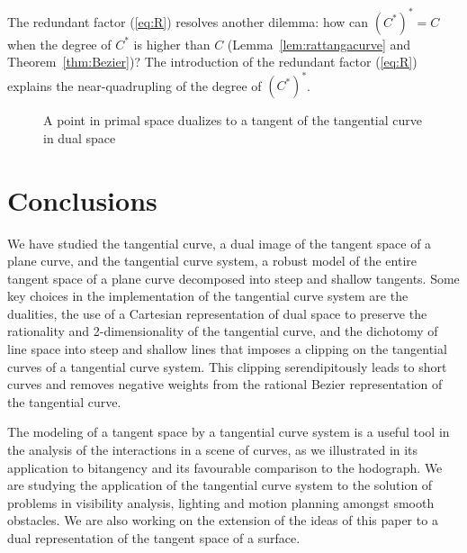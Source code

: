 \documentclass[12pt]{article}
\begin{document}

The redundant factor (\ref{eq:R}) resolves another dilemma:
how can $(C^*)^* = C$ when the degree of $C^*$ is higher than $C$
(Lemma~\ref{lem:rattangacurve} and Theorem~\ref{thm:Bezier})?
The introduction of the redundant factor (\ref{eq:R}) explains the 
near-quadrupling of the degree of $(C^*)^*$.

\begin{figure}[h]
\centerline{}
\caption{A point in primal space dualizes to a tangent of the tangential curve in dual space}
\label{fig:pt2tang}
\end{figure}


\section{Conclusions}
\label{sec:conclude}

We have studied the tangential curve, a dual image of the tangent space of
a plane curve, and the tangential curve system, a robust model of the entire tangent
space of a plane curve decomposed into steep and shallow tangents.
Some key choices in the implementation of the tangential curve system
are the dualities,
the use of a Cartesian representation of dual space to preserve the 
rationality and 2-dimensionality of the tangential curve,
and the dichotomy of line space into steep and shallow lines
that imposes a clipping on the 
tangential curves of a tangential curve system.
This clipping serendipitously leads to short curves 
and removes negative weights from the rational Bezier representation
of the tangential curve.

The modeling of a tangent space by a tangential curve system is
a useful tool in the analysis of the interactions in a scene of curves, 
as we illustrated in its application to bitangency 
and its favourable comparison to the hodograph.
We are studying the application of the tangential curve system 
to the solution of problems in visibility analysis,
lighting and motion planning amongst smooth obstacles.
We are also working on the extension of the ideas of this paper to 
a dual representation of the tangent space of a surface.
\end{document}
